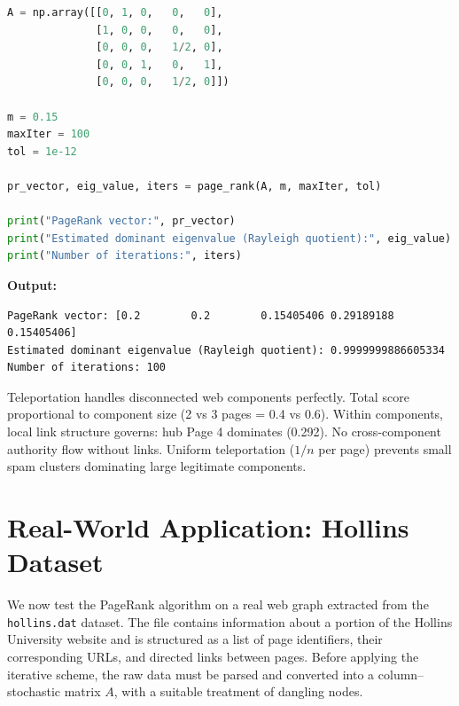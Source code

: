 \documentclass[11pt]{article}
\begin{document}
\begin{lstlisting}[language=Python]
A = np.array([[0, 1, 0,   0,   0],
              [1, 0, 0,   0,   0],
              [0, 0, 0,   1/2, 0],
              [0, 0, 1,   0,   1],
              [0, 0, 0,   1/2, 0]])

m = 0.15
maxIter = 100
tol = 1e-12

pr_vector, eig_value, iters = page_rank(A, m, maxIter, tol)

print("PageRank vector:", pr_vector)
print("Estimated dominant eigenvalue (Rayleigh quotient):", eig_value)
print("Number of iterations:", iters)
\end{lstlisting}

\noindent\textbf{Output:}
\begin{lstlisting}
PageRank vector: [0.2        0.2        0.15405406 0.29189188 0.15405406]
Estimated dominant eigenvalue (Rayleigh quotient): 0.9999999886605334
Number of iterations: 100
\end{lstlisting}



\noindent Teleportation handles disconnected web components perfectly. Total score proportional to component size (2 vs 3 pages = 0.4 vs 0.6). Within components, local link structure governs: hub Page 4 dominates (0.292). No cross-component authority flow without links. Uniform teleportation ($1/n$ per page) prevents small spam clusters dominating large legitimate components.





\newpage
\section{Real-World Application: Hollins Dataset}







We now test the PageRank algorithm on a real web graph extracted from the
\texttt{hollins.dat} dataset.  
The file contains information about a portion of the Hollins University website
and is structured as a list of page identifiers, their corresponding URLs, and
directed links between pages.  
Before applying the iterative scheme, the raw data must be parsed and converted
into a column--stochastic matrix \(A\), with a suitable treatment of dangling
nodes.
\end{document}

